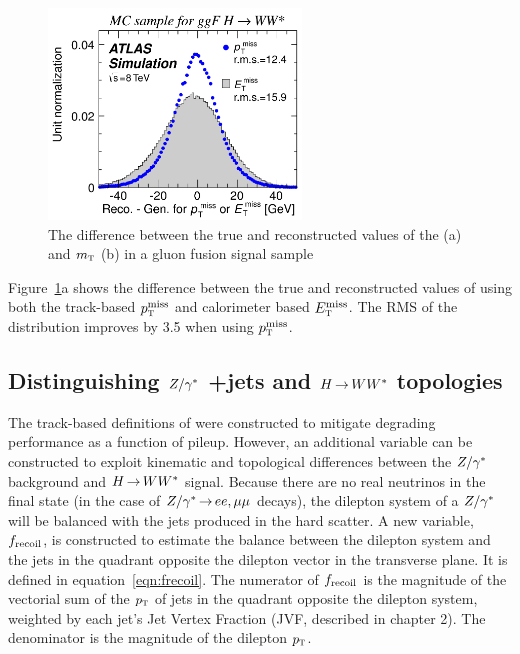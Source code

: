 \begin{figure}[h!]
  \centering
  \captionsetup{justification=centering}

  \includegraphics[width=0.6\textwidth]{figures/METResolution2}
  \caption{The difference between the true and reconstructed values of the \met (a) and $m_{\textrm{\footnotesize\sc t}}$ (b) in a gluon fusion signal sample}
  \label{fig:METResolution2}
\end{figure}

Figure~\ref{fig:METResolution2}a shows the difference between the true and reconstructed values of \met using both the track-based $p_{\textrm{\footnotesize\sc t}}^{\rm miss}$ and calorimeter based $E_{\textrm{\footnotesize\sc t}}^{\rm miss}$. The RMS of the distribution improves by 3.5 \GeV when using $p_{\textrm{\footnotesize\sc t}}^{\rm miss}$.

\subsection{Distinguishing $Z/\gamma^{\ast}$ +jets and $H{\,{\rightarrow}\,}WW^\ast$ topologies}

The track-based definitions of \met were constructed to mitigate degrading performance as a function of pileup. However, an additional variable can be constructed to exploit kinematic and topological differences between the $Z/\gamma^{\ast}$ background and $H{\,{\rightarrow}\,}WW^\ast$ signal. Because there are no real neutrinos in the final state (in the case of $Z/\gamma^{*} \,{\rightarrow}\, ee,\mu\mu$ decays), the dilepton system of a $Z/\gamma^{\ast}$ will be balanced with the jets produced in the hard scatter. A new variable, $f_{\rm recoil}$, is constructed to estimate the balance between the dilepton system and the jets in the quadrant opposite the dilepton vector in the transverse plane. It is defined in equation~\ref{eqn:frecoil}. The numerator of $f_{\rm recoil}$ is the magnitude of the vectorial sum of the $p_{\textrm{\footnotesize\sc t}}$ of jets in the quadrant opposite the dilepton system, weighted by each jet's Jet Vertex Fraction (JVF, described in chapter 2). The denominator is the magnitude of the dilepton $p_{\textrm{\footnotesize\sc t}}$. 

